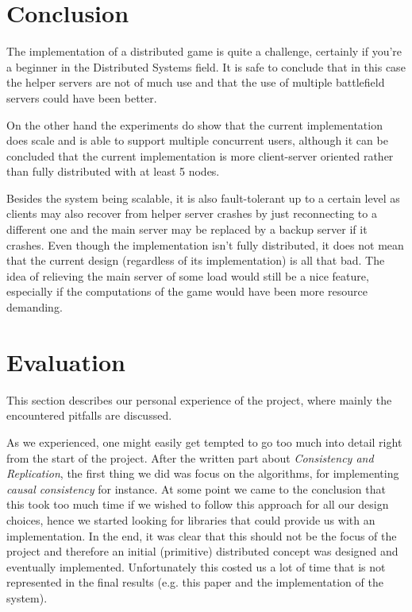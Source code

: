 \section{Conclusion}
The implementation of a distributed game is quite a challenge, certainly if you're a beginner in the Distributed Systems field. 
It is safe to conclude that in this case the helper servers are not of much use and that the use of multiple battlefield servers could have been better.

On the other hand the experiments do show that the current implementation does scale and is able to support multiple concurrent users, although it can be concluded that the current implementation is more client-server oriented rather than fully distributed with at least 5 nodes.

Besides the system being scalable, it is also fault-tolerant up to a certain level as clients may also recover from helper server crashes by just reconnecting to a different one and the main server may be replaced by a backup server if it crashes.
Even though the implementation isn't fully distributed, it does not mean that the current design (regardless of its implementation) is all that bad. 
The idea of relieving the main server of some load would still be a nice feature, especially if the computations of the game would have been more resource demanding. 

 \section{Evaluation}
 This section describes our personal experience of the project, where mainly the encountered pitfalls are discussed.

As we experienced, one might easily get tempted to go too much into detail right from the start of the project.
After the written part about \emph{Consistency and Replication}, the first thing we did was focus on the algorithms, for implementing \emph{causal consistency} for instance. 
At some point we came to the conclusion that this took too much time if we wished to follow this approach for all our design choices, hence we started looking for libraries that could provide us with an implementation. 
In the end, it was clear that this should not be the focus of the project and therefore an initial (primitive) distributed concept was designed and eventually implemented. 
Unfortunately this costed us a lot of time that is not represented in the final results (e.g. this paper and the implementation of the system).

